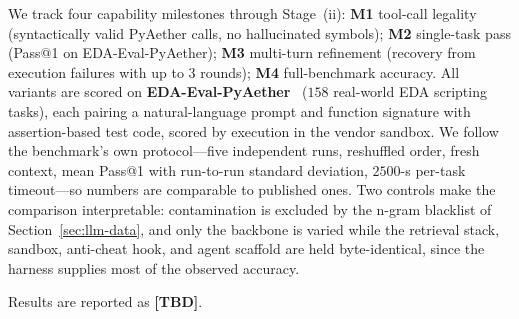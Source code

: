 We track four capability milestones through Stage~(ii): \textbf{M1} tool-call legality (syntactically valid PyAether calls, no hallucinated symbols); \textbf{M2} single-task pass (Pass@1 on EDA-Eval-PyAether); \textbf{M3} multi-turn refinement (recovery from execution failures with up to 3 rounds); \textbf{M4} full-benchmark accuracy.
All variants are scored on \textbf{EDA-Eval-PyAether}~\cite{liu2026zhulong} ($158$ real-world EDA scripting tasks), each pairing a natural-language prompt and function signature with assertion-based test code, scored by execution in the vendor sandbox.
We follow the benchmark's own protocol---five independent runs, reshuffled order, fresh context, mean Pass@1 with run-to-run standard deviation, $2500$-s per-task timeout---so numbers are comparable to published ones.
Two controls make the comparison interpretable: contamination is excluded by the n-gram blacklist of Section~\ref{sec:llm-data}, and only the backbone is varied while the retrieval stack, sandbox, anti-cheat hook, and agent scaffold are held byte-identical, since the harness supplies most of the observed accuracy.

Results are reported as \textbf{[TBD]}.
